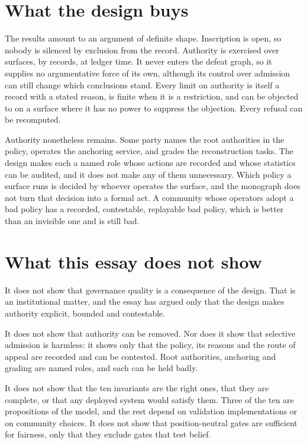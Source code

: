 \documentclass[11pt]{article}
\begin{document}
\section{What the design buys}\label{sec:buy}

The results amount to an argument of definite shape. Inscription is open, so nobody is silenced by exclusion from the record. Authority is exercised over surfaces, by records, at ledger time. It never enters the defeat graph, so it supplies no argumentative force of
its own, although its control over admission can still change which
conclusions stand. Every limit on authority is itself a record with a stated reason, is finite when it is a restriction, and can be objected to on a surface where it has no power to suppress the objection. Every refusal can be recomputed.

Authority nonetheless remains. Some party names the root authorities in the policy, operates the anchoring service, and grades the reconstruction tasks. The design makes each a named role whose actions are recorded and whose statistics can be audited, and it does not make any of them unnecessary. Which policy a surface runs is decided by whoever operates the surface, and the monograph does not turn that decision into a formal act. A community whose operators adopt a bad policy has a recorded, contestable, replayable bad policy, which is better than an invisible one and is still bad.

\section{What this essay does not show}\label{sec:limits}

It does not show that governance quality is a consequence of the design. That is an institutional matter, and the essay has argued only that the design makes authority explicit, bounded and contestable.

It does not show that authority can be removed. Nor does it show that
selective admission is harmless: it shows only that the policy, its
reasons and the route of appeal are recorded and can be contested. Root authorities, anchoring and grading are named roles, and each can be held badly.

It does not show that the ten invariants are the right ones, that they are complete, or that any deployed system would satisfy them. Three of the ten are propositions of the model, and the rest depend on validation implementations or on community choices. It does not show that position-neutral gates are sufficient for fairness, only that they exclude gates that test belief.
\end{document}
